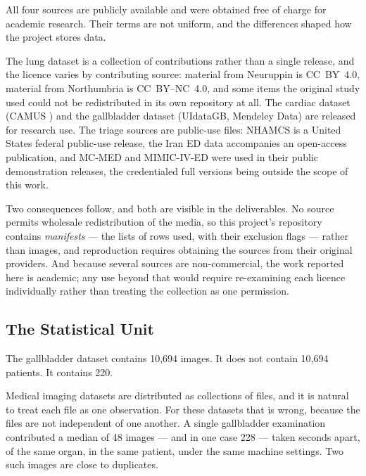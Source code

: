 All four sources are publicly available and were obtained free of charge for academic
research. Their terms are not uniform, and the differences shaped how the project stores data.

The lung dataset \cite{born2021pocus} is a collection of contributions rather than a single
release, and the licence varies by contributing source: material from Neuruppin is CC~BY~4.0,
material from Northumbria is CC~BY--NC~4.0, and some items the original study used could not
be redistributed in its own repository at all. The cardiac dataset (CAMUS
\cite{leclerc2019camus}) and the gallbladder dataset (UIdataGB, Mendeley Data) are released
for research use. The triage sources are public-use files: NHAMCS is a United States federal
public-use release, the Iran ED data accompanies an open-access publication, and MC-MED and
MIMIC-IV-ED were used in their public demonstration releases, the credentialed full versions
being outside the scope of this work.

Two consequences follow, and both are visible in the deliverables. No source permits
wholesale redistribution of the media, so this project's repository contains
\emph{manifests} --- the lists of rows used, with their exclusion flags --- rather than
images, and reproduction requires obtaining the sources from their original providers. And
because several sources are non-commercial, the work reported here is academic; any use
beyond that would require re-examining each licence individually rather than treating the
collection as one permission.

\subsection{The Statistical Unit}
\label{subsec:data-grouping}

\begin{keystatement}
The gallbladder dataset contains 10{,}694 images. It does not contain 10{,}694 patients. It
contains 220.
\end{keystatement}

Medical imaging datasets are distributed as collections of files, and it is natural to treat
each file as one observation. For these datasets that is wrong, because the files are not
independent of one another. A single gallbladder examination contributed a median of 48
images --- and in one case 228 --- taken seconds apart, of the same organ, in the same
patient, under the same machine settings. Two such images are close to duplicates.

